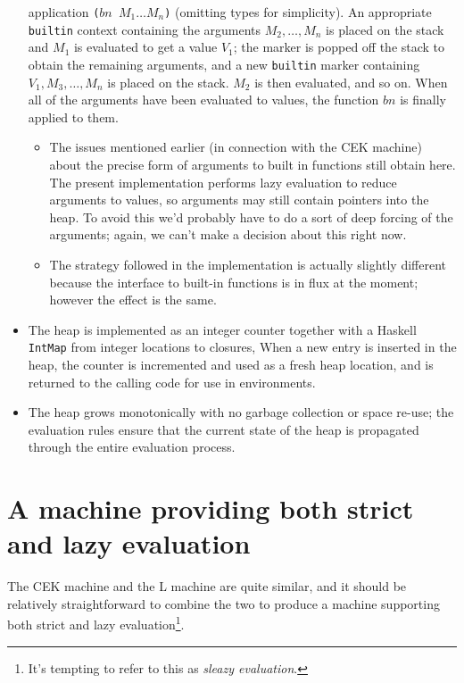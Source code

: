 \documentclass[a4paper]{article}
\begin{document}
\begin{itemize}
    application \texttt{($bn$ $M_1 \ldots M_n$)} (omitting types for
    simplicity). An appropriate \texttt{builtin} context containing
    the arguments $M_2, \ldots, M_n$ is placed on the stack and $M_1$ is
    evaluated to get a value $V_1$; the marker is popped off the stack to 
    obtain the remaining arguments, and a new \texttt{builtin} marker 
    containing $V_1,  M_3, \ldots, M_n$ is placed on the stack.  $M_2$ is
    then evaluated, and so on.  When all of the arguments have been evaluated
    to values, the function $bn$ is finally applied to them. 
    \begin{itemize}
      \item The issues mentioned earlier (in connection with the CEK
        machine) about the precise form of arguments to built in
        functions still obtain here.  The present implementation
        performs lazy evaluation to reduce arguments to values, so
        arguments may still contain pointers into the heap.  To avoid
        this we'd probably have to do a sort of deep forcing of the
        arguments; again, we can't make a decision about this right now.
      \item The strategy followed in the implementation is actually slightly different
        because the interface to built-in functions is in flux at the moment; however
        the effect is the same.
    \end{itemize}
  \item The heap is implemented as an integer counter together with a
    Haskell \texttt{IntMap} from integer locations to closures,
    When a new entry is inserted in the heap, the counter
    is incremented and used as a fresh heap location, and is returned 
    to the calling code for use in environments.
  \item The heap grows monotonically with no garbage collection or space re-use;
    the evaluation rules ensure that the current state of the heap is propagated 
    through the entire evaluation process.
    
\end{itemize}


\newpage

\section{A machine providing both strict and lazy evaluation}\label{sec:strict-lazy}
The CEK machine and the L machine are quite similar, and it should be
relatively straightforward to combine the two to produce a machine
supporting both strict and lazy evaluation\footnote{It's tempting to
  refer to this as \textit{sleazy evaluation}.}.
\\
\end{document}
